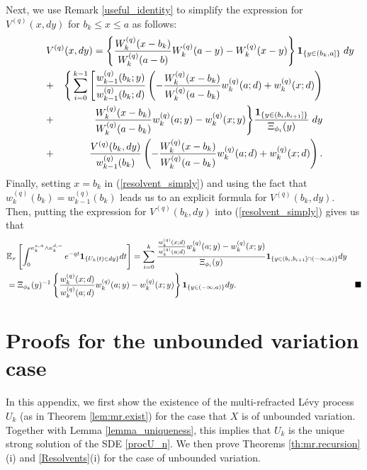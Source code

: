 \documentclass[12pt,reqno]{amsart}
\theoremstyle{definition}
\theoremstyle{remark}
\newcommand{\e}{\mathbb{E}}
\newcommand{\ind}{\mathbf{1}}
\newcommand{\wq}{w^{(q)}}
\begin{document}
Next, we use Remark \ref{useful_identity} to simplify the expression for $V^{(q)}(x, dy)$ for $b_k \leq x \leq a$ as follows:
\begin{eqnarray}\label{resolvent_simply}\nonumber
\lefteqn{V^{(q)}(x,dy)=
\left\{\frac{W_{k}^{(q)}(x-b_k)}{W_{k}^{(q)}(a-b)}W_{k}^{(q)}(a-y)-W_{k}^{(q)}(x-y)\right\} \ind_{\{y\in (b_k,a]\}}\;dy}
\\\nonumber &+&
\Bigg\{\sum_{i=0}^{k-1}\Bigg[ \frac{w_{k-1}^{(q)}(b_k;y)}{w_{k-1}^{(q)}(b_k;d)}\left(- \frac{W_k^{(q)}(x-b_k)}{W_k^{(q)}(a-b_k)}\wq_{k}(a;d)+\wq_{k}(x;d)\right)\\\nonumber &+&
\frac{W_k^{(q)}(x-b_k)}{W_k^{(q)}(a-b_k)}\wq_{k}(a;y)-\wq_{k}(x;y)\Bigg\}\frac{\ind_{\{y\in (b_i,b_{i+1}]\}}}{\Xi_{\phi_i} (y)}\; dy \\&+&
\frac{V^{(q)}(b_k, dy)}{w^{(q)}_{k-1}(b_k)} \left( - \frac{W_k^{(q)}(x-b_k)}{W_k^{(q)}(a-b_k)}\wq_{k}(a;d)+\wq_{k}(x;d) \right).
\end{eqnarray}
Finally, setting $x=b_k$ in (\ref{resolvent_simply}) and using the fact that $w^{(q)}_{k}(b_k)=w^{(q)}_{k-1}(b_k)$ leads us to an 
explicit formula for $V^{(q)}(b_k,dy)$. Then, putting the expression for $V^{(q)}(b_k,dy)$ into (\ref{resolvent_simply})
 gives us that
\begin{align*}
&\e_x\left[\int_0^{\kappa_k^{a,+}\wedge \kappa_k^{d,-}}e^{-qt}\ind_{\{U_k(t)\in dy\}}dt\right]
= \sum_{i=0}^{k} \frac{\frac{w_k^{(q)}(x;d)}{w_k^{(q)}(a;d)}w_k^{(q)}(a;y)-w_k^{(q)}(x;y)}
{\Xi_{\phi_i}(y)}\ind_{\{y\in (b_i,b_{i+1}]\cap (-\infty, a)\}} dy\\
&= \Xi_{\phi_k}(y)^{-1} \left\{\frac{w_k^{(q)}(x;d)}{w_k^{(q)}(a;d)}w_k^{(q)}(a;y)-w_k^{(q)}(x;y)
\right\} \ind_{\{y \in (-\infty, a)\}} dy. \textrm{\hspace{5cm}} \blacksquare
\end{align*}


\section{Proofs for the unbounded variation case}\label{UBVcase}

In this appendix, we first show the existence of the multi-refracted L\'evy process $U_k$ (as in Theorem \ref{lem:mr.exist}) 
for the case that $X$ is of unbounded variation. Together with Lemma \ref{lemma_uniqueness}, this implies that $U_k$ is the unique strong solution of 
the SDE \eqref{procU_n}. We then prove Theorems \ref{th:mr.recursion}(i) and \ref{Resolvents}(i) for the case of unbounded variation.
\end{document}
